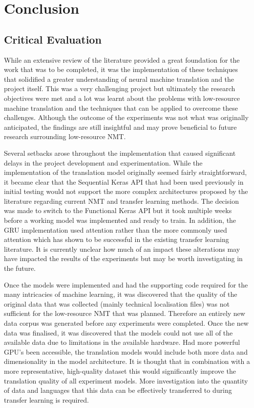 \chapter{Conclusion}
\section{Critical Evaluation}

While an extensive review of the literature provided a great foundation for the work that was to be completed, it was the implementation of these techniques that solidified a greater understanding of neural machine translation and the project itself.
This was a very challenging project but ultimately the research objectives were met and a lot was learnt about the problems with low-resource machine translation and the techniques that can be applied to overcome these challenges. Although the outcome of the experiments was not what was originally anticipated, the findings are still insightful and may prove beneficial to future research surrounding low-resource \acrshort{NMT}.

Several setbacks arose throughout the implementation that caused significant delays in the project development and experimentation. While the implementation of the translation model originally seemed fairly straightforward, it became clear that the Sequential Keras API that had been used previously in initial testing would not support the more complex architectures proposed by the literature regarding current \acrshort{NMT} and transfer learning methods. The decision was made to switch to the Functional Keras API but it took multiple weeks before a working model was implemented and ready to train. In addition, the \acrshort{GRU} implementation used \cite{bahdanau_neural_2016} attention rather than the more commonly used \cite{luong_effective_2015} attention which has shown to be successful in the existing transfer learning literature. It is currently unclear how much of an impact these alterations may have impacted the results of the experiments but may be worth investigating in the future.

Once the models were implemented and had the supporting code required for the many intricacies of machine learning, it was discovered that the quality of the original data that was collected (mainly technical localisation files) was not sufficient for the low-resource \acrshort{NMT} that was planned. Therefore an entirely new data corpus was generated before any experiments were completed. Once the new data was finalised, it was discovered that the models could not use all of the available data due to limitations in the available hardware. Had more powerful GPU's been accessible, the translation models would include both more data and dimensionality in the model architecture. It is thought that in combination with a more representative, high-quality dataset this would significantly improve the translation quality of all experiment models. More investigation into the quantity of data and languages that this data can be effectively transferred to during transfer learning is required.

